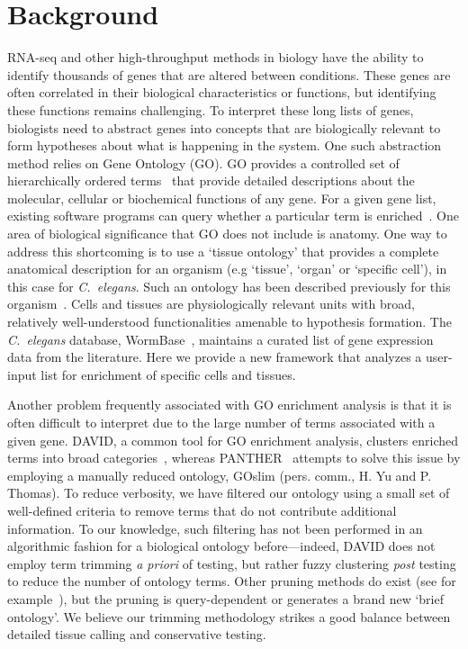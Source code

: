 \documentclass{bmcart}
\begin{document}
\section*{Background}
	RNA-seq and other high-throughput methods in biology have the ability to identify thousands of genes that are altered between conditions. These genes are often correlated in their biological characteristics or functions, but identifying these functions remains challenging. To interpret these long lists of genes, biologists need to abstract genes into concepts that are biologically relevant to form hypotheses about what is happening in the system. One such abstraction method relies on Gene Ontology (GO). GO provides a controlled set of hierarchically ordered terms~\cite{TheGeneOntologyConsortium2000a, TheGeneOntologyConsortium2015} that provide detailed descriptions about the molecular, cellular or biochemical functions of any gene. For a given gene list, existing software programs can query whether a particular term is enriched~\cite{Mi2009, McLean2010, Huang2009, Pathan2015}. One area of biological significance that GO does not include is anatomy. One way to address this shortcoming is to use a `tissue ontology' that provides a complete anatomical description for an organism (e.g `tissue', `organ' or `specific cell'), in this case for \emph{C.~elegans}. Such an ontology has been described previously for this organism~\cite{Lee2003}. Cells and tissues are physiologically relevant units with broad, relatively well-understood functionalities amenable to hypothesis formation. The \emph{C.~elegans} database, WormBase~\cite{Howe2016}, maintains a curated list of gene expression data from the literature. Here we provide a new framework that analyzes a user-input list for enrichment of specific cells and tissues.

Another problem frequently associated with GO enrichment analysis is that it is often difficult to interpret due to the large number of terms associated with a given gene. DAVID, a common tool for GO enrichment analysis, clusters enriched terms into broad categories~\cite{Huang2007}, whereas PANTHER~\cite{Mi2009, Mi2013} attempts to solve this issue by employing a manually reduced ontology, GOslim (pers. comm., H. Yu and P. Thomas). To reduce verbosity, we have filtered our ontology using a small set of well-defined criteria to remove terms that do not contribute additional information. To our knowledge, such filtering has not been performed in an algorithmic fashion for a biological ontology before---indeed, DAVID does not employ term trimming \emph{a priori} of testing, but rather fuzzy clustering \emph{post} testing to reduce the number of ontology terms. Other pruning methods do exist (see for example~\cite{Kim2007, Mambretti2013}), but the pruning is query-dependent or generates a brand new `brief ontology'. We believe our trimming methodology strikes a good balance between detailed tissue calling and conservative testing.
\end{document}
